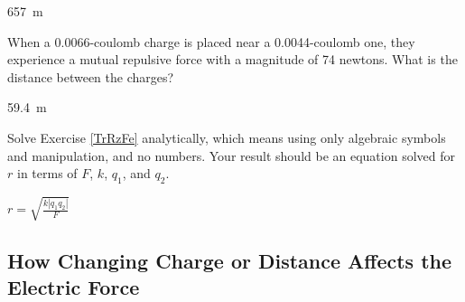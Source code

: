 \documentclass[]{exam}
\begin{document}
\begin{questions}
\begin{center}
\end{center}

\begin{solution}
\SI{657}{m}
\end{solution}


\question \label{bpbHHg}
When a 0.0066-coulomb charge is placed near a 0.0044-coulomb one, they experience a mutual repulsive force with a magnitude of 74 newtons. What is the distance between the charges?

\begin{solution}
\SI{59.4}{m}
\end{solution}



\question \label{DOuqpT}
Solve Exercise \ref{TrRzFe} analytically, which means using
only algebraic symbols and manipulation, and no numbers. Your result should be an equation solved for $r$ in terms of $F$, $k$, $q_1$, and $q_2$.

\begin{solution}
$r = \sqrt{\frac{k |q_1 q_2|}{F}}$
\end{solution}

\end{questions}


\clearpage

\subsection{How Changing Charge or Distance Affects the Electric Force}
\end{document}
